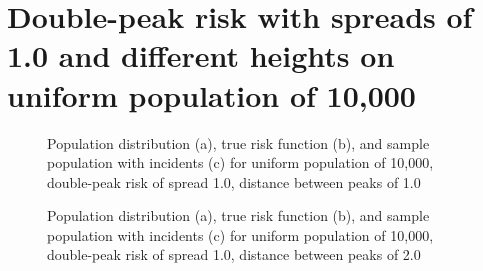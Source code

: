 \section{Double-peak risk with spreads of 1.0 and different heights on uniform population of 10,000}
\label{sec:app:results_unif_100_1_2h_X}

\graphicspath{{./results/unif_100_1_2h_1/}}
\makeatletter
{}
\makeatother

\begin{table}[H]
    
    \caption[]{Error rates for uniform population of 10,000, double-peak risk with \glspl{spread} 1.0, distance between peaks of 1.0}
    \label{tab:mean_error_rates:unif_100_1_2h_1}
\end{table}

\begin{figure}[H]
    
    \caption[]{Population distribution (a), true risk function (b), and sample population with incidents (c) for uniform population of 10,000, double-peak risk of \gls{spread} 1.0, distance between peaks of 1.0}
    \label{fig:distributions:unif_100_1_2h_1}    
\end{figure}

\graphicspath{{./results/unif_100_1_2h_2/}}
\makeatletter
{}
\makeatother

\begin{table}[H]
    
    \caption[]{Error rates for uniform population of 10,000, double-peak risk of \gls{spread} 1.0, distance between peaks of 2.0}
    \label{tab:mean_error_rates:unif_100_1_2h_2}
\end{table}

\begin{figure}[H]
    
    \caption[]{Population distribution (a), true risk function (b), and sample population with incidents (c) for uniform population of 10,000, double-peak risk of \gls{spread} 1.0, distance between peaks of 2.0}
    \label{fig:distributions:unif_100_1_2h_2}    
\end{figure}

